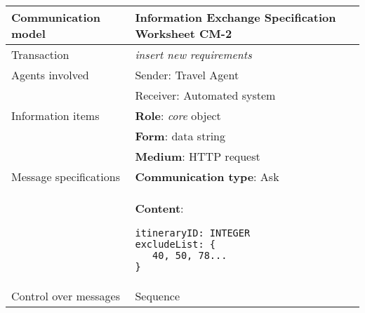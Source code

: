 \newline
\vspace{0.8 cm}
\newline
\noindent
\begin{tabular}%
      {|p{4cm}%
        |p{8cm}|}
\hline
{\bf Communication model} &
   {\bf Information Exchange Specification Worksheet CM-2} \\
\hline
\hline
\sc Transaction &
   {\em
   insert new requirements
   } \\
\hline
\sc Agents involved &
   {\rm Sender: Travel Agent} \\
   & {\rm Receiver: Automated system}\\
\hline
\sc Information items 
&  {\bf Role}: {\em core} object
   \\
&  {\bf Form}: data string
   \\
&  {\bf Medium}: HTTP request
   \\
\hline
\sc Message specifications 
&  {\bf Communication type}: Ask
   \\
&  {\bf Content}: 
\begin{lstlisting}[breaklines=true,mathescape=true]
itineraryID: INTEGER
excludeList: {
   40, 50, 78...
}
\end{lstlisting}
   \\
\hline
\sc Control over messages &
   Sequence
   \\
\hline
\end{tabular}
